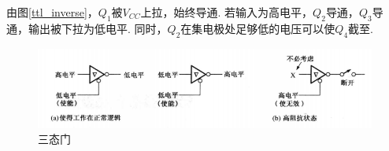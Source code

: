 \par 由图\ref{ttl_inverse}，$Q_1$被$V_{CC}$上拉，始终导通. 若输入为高电平，$Q_2$导通，$Q_3$导通，输出被下拉为低电平. 同时，$Q_2$在集电极处足够低的电压可以使$Q_4$截至.
\begin{figure}[htbp]
	\centering
	\includegraphics[width=0.6\linewidth]{fig/three_gates.PNG}
	\caption{三态门}
\end{figure}